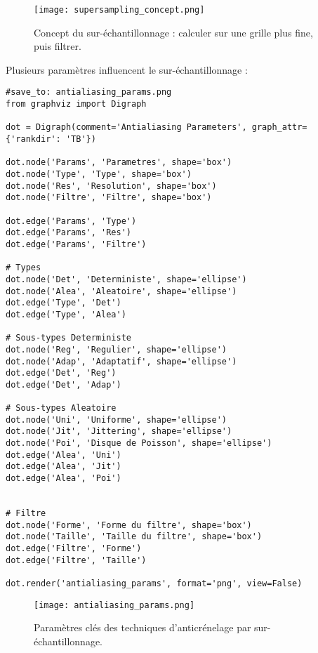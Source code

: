 \documentclass{article}
\begin{document}
\begin{figure}[H]
\centering
\texttt{[image: supersampling\_concept.png]}
\caption{Concept du sur-échantillonnage : calculer sur une grille plus fine, puis filtrer.}
\label{fig:supersampling_concept}
\end{figure}

Plusieurs paramètres influencent le sur-échantillonnage :

\begin{verbatim}
#save_to: antialiasing_params.png
from graphviz import Digraph

dot = Digraph(comment='Antialiasing Parameters', graph_attr={'rankdir': 'TB'})

dot.node('Params', 'Parametres', shape='box')
dot.node('Type', 'Type', shape='box')
dot.node('Res', 'Resolution', shape='box')
dot.node('Filtre', 'Filtre', shape='box')

dot.edge('Params', 'Type')
dot.edge('Params', 'Res')
dot.edge('Params', 'Filtre')

# Types
dot.node('Det', 'Deterministe', shape='ellipse')
dot.node('Alea', 'Aleatoire', shape='ellipse')
dot.edge('Type', 'Det')
dot.edge('Type', 'Alea')

# Sous-types Deterministe
dot.node('Reg', 'Regulier', shape='ellipse')
dot.node('Adap', 'Adaptatif', shape='ellipse')
dot.edge('Det', 'Reg')
dot.edge('Det', 'Adap')

# Sous-types Aleatoire
dot.node('Uni', 'Uniforme', shape='ellipse')
dot.node('Jit', 'Jittering', shape='ellipse')
dot.node('Poi', 'Disque de Poisson', shape='ellipse')
dot.edge('Alea', 'Uni')
dot.edge('Alea', 'Jit')
dot.edge('Alea', 'Poi')


# Filtre
dot.node('Forme', 'Forme du filtre', shape='box')
dot.node('Taille', 'Taille du filtre', shape='box')
dot.edge('Filtre', 'Forme')
dot.edge('Filtre', 'Taille')

dot.render('antialiasing_params', format='png', view=False)
\end{verbatim}

\begin{figure}[H]
\centering
\texttt{[image: antialiasing\_params.png]}
\caption{Paramètres clés des techniques d'anticrénelage par sur-échantillonnage.}
\label{fig:antialiasing_params}
\end{figure}
\end{document}
